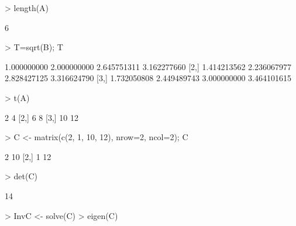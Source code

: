 \documentclass{article}
\begin{document}
\begin{Schunk}
\begin{Sinput}
> length(A)
\end{Sinput}
\begin{Soutput}
[1] 6
\end{Soutput}
\begin{Sinput}
> T=sqrt(B); T
\end{Sinput}
\begin{Soutput}
            [,1]        [,2]        [,3]        [,4]
[1,] 1.000000000 2.000000000 2.645751311 3.162277660
[2,] 1.414213562 2.236067977 2.828427125 3.316624790
[3,] 1.732050808 2.449489743 3.000000000 3.464101615
\end{Soutput}
\begin{Sinput}
> t(A)
\end{Sinput}
\begin{Soutput}
     [,1] [,2]
[1,]    2    4
[2,]    6    8
[3,]   10   12
\end{Soutput}
\begin{Sinput}
> C <- matrix(c(2, 1, 10, 12), nrow=2, ncol=2); C
\end{Sinput}
\begin{Soutput}
     [,1] [,2]
[1,]    2   10
[2,]    1   12
\end{Soutput}
\begin{Sinput}
> det(C)
\end{Sinput}
\begin{Soutput}
[1] 14
\end{Soutput}
\begin{Sinput}
> InvC <- solve(C)
> eigen(C)
\end{Sinput}
\end{Schunk}
\end{document}
